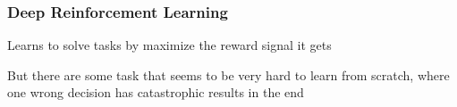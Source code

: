 \begin{frame}
    \frametitle{Deep Reinforcement Learning}

\begin{PraesentationAufzaehlung}
    \item Learns to solve tasks by maximize the reward signal it gets
    \item But there are some task that seems to be very hard to learn from scratch, where one wrong decision has catastrophic results in the end
\end{PraesentationAufzaehlung}

\end{frame}
\clearpage


